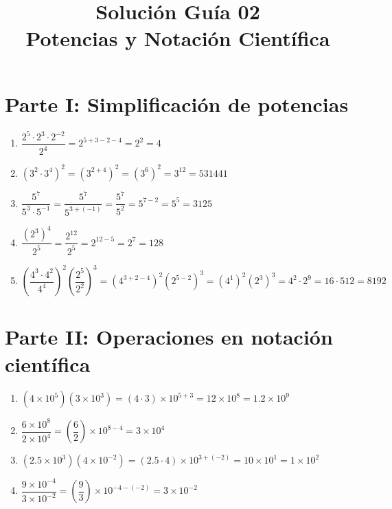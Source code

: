 \documentclass[12pt]{article}
\title{\textbf{Solución Guía 02}\\ Potencias y Notación Científica}
\author{}
\date{}
\begin{document}
	
	\maketitle
	
	\section*{Parte I: Simplificación de potencias}
	
	\begin{enumerate}
		
		\item $
		\dfrac{2^5\cdot 2^3\cdot 2^{-2}}{2^4}
		=2^{5+3-2-4}
		=2^2
		=4
		$
		
		\item $
		(3^2\cdot 3^4)^2
		=(3^{2+4})^2
		=(3^6)^2
		=3^{12}
		=531441
		$
		
		\item $
		\dfrac{5^7}{5^3\cdot 5^{-1}}
		=\dfrac{5^7}{5^{3+(-1)}}
		=\dfrac{5^7}{5^2}
		=5^{7-2}
		=5^5
		=3125
		$
		
		\item $
		\dfrac{(2^3)^4}{2^5}
		=\dfrac{2^{12}}{2^5}
		=2^{12-5}
		=2^7
		=128
		$
		
		\item $
		\left(\dfrac{4^3\cdot 4^2}{4^4}\right)^2
		\left(\dfrac{2^5}{2^2}\right)^3
		=
		\left(4^{3+2-4}\right)^2
		\left(2^{5-2}\right)^3
		=
		(4^1)^2(2^3)^3
		=4^2\cdot 2^9
		=16\cdot 512
		=8192
		$
		
	\end{enumerate}
	
	\section*{Parte II: Operaciones en notación científica}
	
	\begin{enumerate}
		
		\item $
		(4\times10^5)(3\times10^3)
		=(4\cdot 3)\times10^{5+3}
		=12\times10^8
		=1.2\times10^9
		$
		
		\item $
		\dfrac{6\times10^8}{2\times10^4}
		=\left(\dfrac{6}{2}\right)\times10^{8-4}
		=3\times10^4
		$
		
		\item $
		(2.5\times10^3)(4\times10^{-2})
		=(2.5\cdot 4)\times10^{3+(-2)}
		=10\times10^1
		=1\times10^2
		$
		
		\item $
		\dfrac{9\times10^{-4}}{3\times10^{-2}}
		=\left(\dfrac{9}{3}\right)\times10^{-4-(-2)}
		=3\times10^{-2}
		$
		
	\end{enumerate}
	
\end{document}
